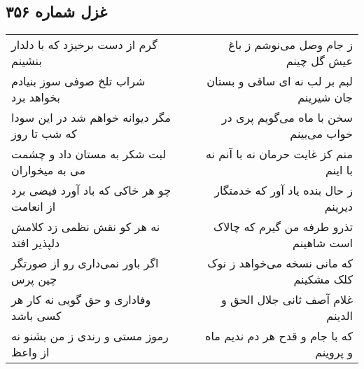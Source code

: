 \begin{center}
\section*{غزل شماره ۳۵۶}
\label{sec:sh356}
\begin{longtable}{l p{0.5cm} r}
گرم از دست برخیزد که با دلدار بنشینم
&&
ز جام وصل می‌نوشم ز باغ عیش گل چینم
\\
شراب تلخ صوفی سوز بنیادم بخواهد برد
&&
لبم بر لب نه ای ساقی و بستان جان شیرینم
\\
مگر دیوانه خواهم شد در این سودا که شب تا روز
&&
سخن با ماه می‌گویم پری در خواب می‌بینم
\\
لبت شکر به مستان داد و چشمت می به میخواران
&&
منم کز غایت حرمان نه با آنم نه با اینم
\\
چو هر خاکی که باد آورد فیضی برد از انعامت
&&
ز حال بنده یاد آور که خدمتگار دیرینم
\\
نه هر کو نقش نظمی زد کلامش دلپذیر افتد
&&
تذرو طرفه من گیرم که چالاک است شاهینم
\\
اگر باور نمی‌داری رو از صورتگر چین پرس
&&
که مانی نسخه می‌خواهد ز نوک کلک مشکینم
\\
وفاداری و حق گویی نه کار هر کسی باشد
&&
غلام آصف ثانی جلال الحق و الدینم
\\
رموز مستی و رندی ز من بشنو نه از واعظ
&&
که با جام و قدح هر دم ندیم ماه و پروینم
\\
\end{longtable}
\end{center}
